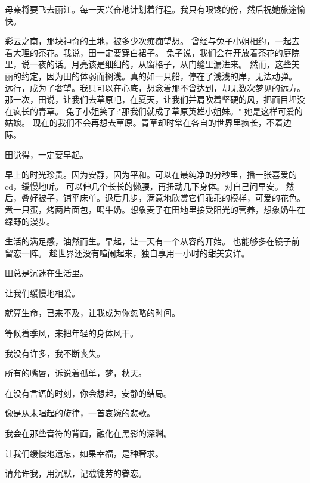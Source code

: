 
		母亲将要飞去丽江。每一天兴奋地计划着行程。我只有眼馋的份，然后祝她旅途愉快。

		\vspace{1em}
		彩云之南，那块神奇的土地，被多少次痴痴望想。
		曾经与兔子小姐相约，一起去看大理的茶花。我说，田一定要穿白裙子。
		兔子说，我们会在开放着茶花的庭院里，说一夜的话。月亮该是细细的，从窗格子，从门缝里漏进来。
		然而，这些美丽的约定，因为田的体弱而搁浅。真的如一只船，停在了浅浅的岸，无法动弹。
		远行，成为了奢望。我只可以在心底，想念着那不曾达到，却无数次梦见的远方。
		那一次，田说，让我们去草原吧，在夏天，让我们并肩吹着坚硬的风，把面目埋没在疯长的青草。
		兔子小姐笑了:"那我们就成了草原英雄小姐妹。"
		她是这样可爱的姑娘。
		现在的我们不会再想去草原。青草却时常在各自的世界里疯长，不着边际。



		田觉得，一定要早起。

		\vspace{1em}
		早上的时光珍贵。因为安静，因为平和。可以在最纯净的分秒里，播一张喜爱的cd，缓慢地听。
		可以伸几个长长的懒腰，再扭动几下身体。对自己问早安。
		然后，叠好被子，铺平床单。退后几步，满意地欣赏它们乖乖的模样，可爱的花色。
		煮一只蛋，烤两片面包，喝牛奶。想象麦子在田地里接受阳光的营养，想象奶牛在绿野的漫步。

		\vspace{1em}
		生活的满足感，油然而生。早起，让一天有一个从容的开始。
		也能够多在镜子前留恋一阵。
		趁世界还没有喧闹起来，独自享用一小时的甜美安详。

		\vspace{1em}
		田总是沉迷在生活里。

	\endwriting



		让我们缓慢地相爱。

		就算生命，已来不及，让我成为你忽略的时间。

		等候着季风，来把年轻的身体风干。

		我没有许多，我不断丧失。

		所有的嘴唇，诉说着孤单，梦，秋天。

		在没有言语的时刻，你会想起，安静的结局。

		像是从未唱起的旋律，一首哀婉的悲歌。

		我会在那些音符的背面，融化在黑影的深渊。

		让我们缓慢地遗忘，如果幸福，是种奢求。

		请允许我，用沉默，记载徒劳的眷恋。

